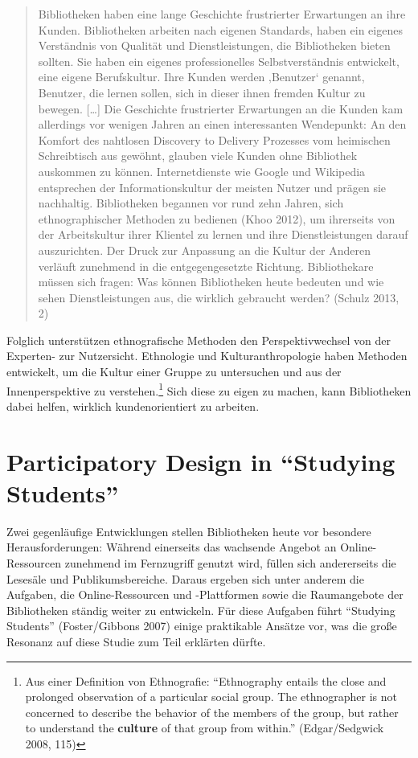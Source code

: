 \documentclass[a4paper,
fontsize=11pt,
oneside,
numbers=noperiodatend,
parskip=half-,
bibliography=totoc,
final
]{scrartcl}
\begin{document}
\begin{quote}
Bibliotheken haben eine lange Geschichte frustrierter Erwartungen an
ihre Kunden. Bibliotheken arbeiten nach eigenen Standards, haben ein
eigenes Verständnis von Qualität und Dienstleistungen, die Bibliotheken
bieten sollten. Sie haben ein eigenes professionelles Selbstverständnis
entwickelt, eine eigene Berufskultur. Ihre Kunden werden ‚Benutzer`
genannt, Benutzer, die lernen sollen, sich in dieser ihnen fremden
Kultur zu bewegen. {[}\ldots{}{]} Die Geschichte frustrierter
Erwartungen an die Kunden kam allerdings vor wenigen Jahren an einen
interessanten Wendepunkt: An den Komfort des nahtlosen Discovery to
Delivery Prozesses vom heimischen Schreibtisch aus gewöhnt, glauben
viele Kunden ohne Bibliothek auskommen zu können. Internetdienste wie
Google und Wikipedia entsprechen der Informationskultur der meisten
Nutzer und prägen sie nachhaltig. Bibliotheken begannen vor rund zehn
Jahren, sich ethnographischer Methoden zu bedienen (Khoo 2012), um
ihrerseits von der Arbeitskultur ihrer Klientel zu lernen und ihre
Dienstleistungen darauf auszurichten. Der Druck zur Anpassung an die
Kultur der Anderen verläuft zunehmend in die entgegengesetzte Richtung.
Bibliothekare müssen sich fragen: Was können Bibliotheken heute bedeuten
und wie sehen Dienstleistungen aus, die wirklich gebraucht werden?
(Schulz 2013, 2)
\end{quote}

Folglich unterstützen ethnografische Methoden den Perspektivwechsel von
der Experten- zur Nutzersicht. Ethnologie und Kulturanthropologie haben
Methoden entwickelt, um die Kultur einer Gruppe zu untersuchen und aus
der Innenperspektive zu verstehen.\footnote{Aus einer Definition von
  Ethnografie: \enquote{Ethnography entails the close and prolonged
  observation of a particular social group. The ethnographer is not
  concerned to describe the behavior of the members of the group, but
  rather to understand the \textbf{culture} of that group from within.}
  (Edgar/Sedgwick 2008, 115)} Sich diese zu eigen zu machen, kann
Bibliotheken dabei helfen, wirklich kundenorientiert zu arbeiten.

\section*{Participatory Design in \enquote{Studying
Students}}\label{participatory-design-in-studying-students}

Zwei gegenläufige Entwicklungen stellen Bibliotheken heute vor besondere
Herausforderungen: Während einerseits das wachsende Angebot an
Online-Ressourcen zunehmend im Fernzugriff genutzt wird, füllen sich
andererseits die Lesesäle und Publikumsbereiche. Daraus ergeben sich
unter anderem die Aufgaben, die Online-Ressourcen und -Plattformen sowie
die Raumangebote der Bibliotheken ständig weiter zu entwickeln. Für
diese Aufgaben führt \enquote{Studying Students} (Foster/Gibbons 2007)
einige praktikable Ansätze vor, was die große Resonanz auf diese Studie
zum Teil erklärten dürfte.
\end{document}
